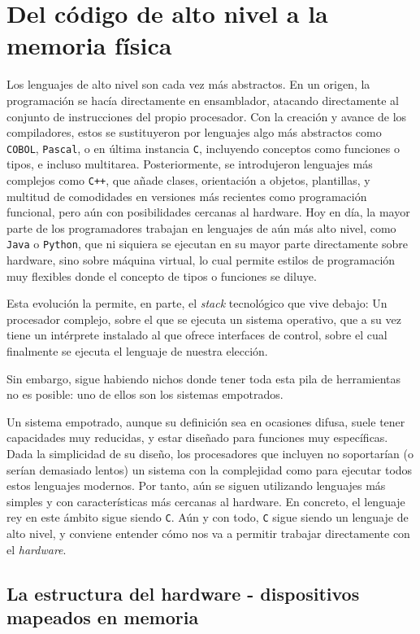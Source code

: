 \documentclass[../main.tex]{subfiles}
\begin{document}
\section{Del código de alto nivel a la memoria física}

    Los lenguajes de alto nivel son cada vez más abstractos. En un origen, la programación se hacía directamente en ensamblador, atacando directamente al conjunto de instrucciones del propio procesador. Con la creación y avance de los compiladores, estos se sustituyeron por lenguajes algo más abstractos como \texttt{COBOL}, \texttt{Pascal}, o en última instancia \texttt{C}, incluyendo conceptos como funciones o tipos, e incluso multitarea. Posteriormente, se introdujeron lenguajes más complejos como \texttt{C++}, que añade clases, orientación a objetos, plantillas, y multitud de comodidades en versiones más recientes como programación funcional, pero aún con posibilidades cercanas al hardware. Hoy en día, la mayor parte de los programadores trabajan en lenguajes de aún más alto nivel, como \texttt{Java} o \texttt{Python}, que ni siquiera se ejecutan en su mayor parte directamente sobre hardware, sino sobre máquina virtual, lo cual permite estilos de programación muy flexibles donde el concepto de tipos o funciones se diluye.
    
    Esta evolución la permite, en parte, el \emph{stack} tecnológico que vive debajo: Un procesador complejo, sobre el que se ejecuta un sistema operativo, que a su vez tiene un intérprete instalado al que ofrece interfaces de control, sobre el cual finalmente se ejecuta el lenguaje de nuestra elección.

    Sin embargo, sigue habiendo nichos donde tener toda esta pila de herramientas no es posible: uno de ellos son los sistemas empotrados.

    Un sistema empotrado, aunque su definición sea en ocasiones difusa, suele tener capacidades muy reducidas, y estar diseñado para funciones muy específicas. Dada la simplicidad de su diseño, los procesadores que incluyen no soportarían (o serían demasiado lentos) un sistema con la complejidad como para ejecutar todos estos lenguajes modernos. Por tanto, aún se siguen utilizando lenguajes más simples y con características más cercanas al hardware. En concreto, el lenguaje rey en este ámbito sigue siendo \texttt{C}. Aún y con todo, \texttt{C} sigue siendo un lenguaje de alto nivel, y conviene entender cómo nos va a permitir trabajar directamente con el \emph{hardware}.

    \subsection{La estructura del hardware - dispositivos mapeados en memoria}
\end{document}
